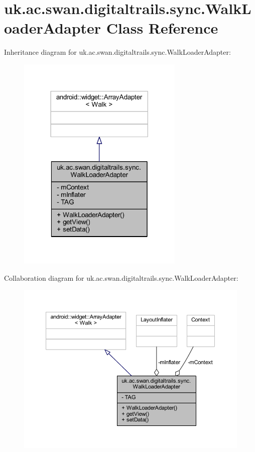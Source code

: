 \hypertarget{classuk_1_1ac_1_1swan_1_1digitaltrails_1_1sync_1_1_walk_loader_adapter}{\section{uk.\+ac.\+swan.\+digitaltrails.\+sync.\+Walk\+Loader\+Adapter Class Reference}
\label{classuk_1_1ac_1_1swan_1_1digitaltrails_1_1sync_1_1_walk_loader_adapter}
}


Inheritance diagram for uk.\+ac.\+swan.\+digitaltrails.\+sync.\+Walk\+Loader\+Adapter\+:
\nopagebreak
\begin{figure}[H]
\begin{center}
\leavevmode
\includegraphics[width=225pt]{classuk_1_1ac_1_1swan_1_1digitaltrails_1_1sync_1_1_walk_loader_adapter__inherit__graph}
\end{center}
\end{figure}


Collaboration diagram for uk.\+ac.\+swan.\+digitaltrails.\+sync.\+Walk\+Loader\+Adapter\+:
\nopagebreak
\begin{figure}[H]
\begin{center}
\leavevmode
\includegraphics[width=350pt]{classuk_1_1ac_1_1swan_1_1digitaltrails_1_1sync_1_1_walk_loader_adapter__coll__graph}
\end{center}
\end{figure}
